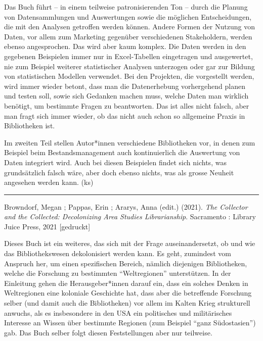 \documentclass[a4paper,
fontsize=11pt,
oneside,
numbers=noperiodatend,
parskip=half-,
bibliography=totoc,
final
]{scrartcl}
\begin{document}
Das Buch führt -- in einem teilweise patronisierenden Ton -- durch die
Planung von Datensammlungen und Auswertungen sowie die möglichen
Entscheidungen, die mit den Analysen getroffen werden können. Andere
Formen der Nutzung von Daten, vor allem zum Marketing gegenüber
verschiedenen Stakeholdern, werden ebenso angesprochen. Das wird aber
kaum komplex. Die Daten werden in den gegebenen Beispielen immer nur in
Excel-Tabellen eingetragen und ausgewertet, nie zum Beispiel weiterer
statistischer Analysen unterzogen oder gar zur Bildung von statistischen
Modellen verwendet. Bei den Projekten, die vorgestellt werden, wird
immer wieder betont, dass man die Datenerhebung vorhergehend planen und
testen soll, sowie sich Gedanken machen muss, welche Daten man wirklich
benötigt, um bestimmte Fragen zu beantworten. Das ist alles nicht
falsch, aber man fragt sich immer wieder, ob das nicht auch schon so
allgemeine Praxis in Bibliotheken ist.

Im zweiten Teil stellen Autor*innen verschiedene Bibliotheken vor, in
denen zum Beispiel beim Bestandsmanagement auch kontinuierlich die
Auswertung von Daten integriert wird. Auch bei diesen Beispielen findet
sich nichts, was grundsätzlich falsch wäre, aber doch ebenso nichts, was
als grosse Neuheit angesehen werden kann. (ks)

\begin{center}\rule{0.5\linewidth}{0.5pt}\end{center}

Browndorf, Megan ; Pappas, Erin ; Ararys, Anna (edit.) (2021). \emph{The
Collector and the Collected: Decolonizing Area Studies Librarianship}.
Sacramento : Library Juice Press, 2021 {[}gedruckt{]}

Dieses Buch ist ein weiteres, das sich mit der Frage auseinandersetzt,
ob und wie das Bibliothekswesen dekolonisiert werden kann. Es geht,
zumindest vom Anspruch her, um einen spezifischen Bereich, nämlich
diejenigen Bibliotheken, welche die Forschung zu bestimmten
\enquote{Weltregionen} unterstützen. In der Einleitung gehen die
Herausgeber*innen darauf ein, dass ein solches Denken in Weltregionen
eine koloniale Geschichte hat, dass aber die betreffende Forschung
selber (und damit auch die Bibliotheken) vor allem im Kalten Krieg
strukturell anwuchs, als es insbesondere in den USA ein politisches und
militärisches Interesse an Wissen über bestimmte Regionen (zum Beispiel
\enquote{ganz Südostasien}) gab. Das Buch selber folgt diesen
Feststellungen aber nur teilweise.
\end{document}
